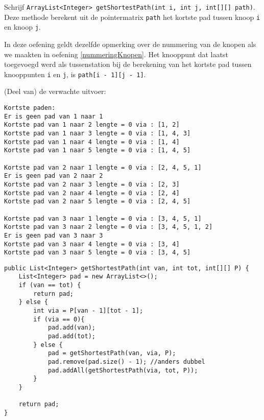 \begin{oef}
\code Schrijf \verb/ArrayList<Integer> getShortestPath(int i, int j, int[][] path)/. Deze methode berekent uit de pointermatrix \verb/path/ het kortste pad tussen knoop \verb/i/ en knoop \verb/j/. 

In deze oefening geldt dezelfde opmerking over de nummering van de knopen als we maakten in oefening \ref{nummeringKnopen}. Het knooppunt dat laatst toegevoegd werd als tussenstation bij de berekening van het kortste pad tussen knooppunten \verb/i/ en \verb/j/, is \verb/path[i - 1][j - 1]/.

(Deel van) de verwachte uitvoer:
\begin{verbatim}
Kortste paden: 
Er is geen pad van 1 naar 1
Kortste pad van 1 naar 2 lengte = 0 via : [1, 2]
Kortste pad van 1 naar 3 lengte = 0 via : [1, 4, 3]
Kortste pad van 1 naar 4 lengte = 0 via : [1, 4]
Kortste pad van 1 naar 5 lengte = 0 via : [1, 4, 5]

Kortste pad van 2 naar 1 lengte = 0 via : [2, 4, 5, 1]
Er is geen pad van 2 naar 2
Kortste pad van 2 naar 3 lengte = 0 via : [2, 3]
Kortste pad van 2 naar 4 lengte = 0 via : [2, 4]
Kortste pad van 2 naar 5 lengte = 0 via : [2, 4, 5]

Kortste pad van 3 naar 1 lengte = 0 via : [3, 4, 5, 1]
Kortste pad van 3 naar 2 lengte = 0 via : [3, 4, 5, 1, 2]
Er is geen pad van 3 naar 3
Kortste pad van 3 naar 4 lengte = 0 via : [3, 4]
Kortste pad van 3 naar 5 lengte = 0 via : [3, 4, 5]
\end{verbatim}

\begin{opl}
\begin{lstlisting}[caption={getShortestPath}, label=FloydgetShortestPath]
public List<Integer> getShortestPath(int van, int tot, int[][] P) {
	List<Integer> pad = new ArrayList<>();
	if (van == tot) {
		return pad;
	} else {
		int via = P[van - 1][tot - 1];
		if (via == 0){
			pad.add(van);
			pad.add(tot);
		} else {
			pad = getShortestPath(van, via, P);
			pad.remove(pad.size() - 1); //anders dubbel
			pad.addAll(getShortestPath(via, tot, P));
		}
	}

	return pad;
}
\end{lstlisting}
\end{opl}
\end{oef}

